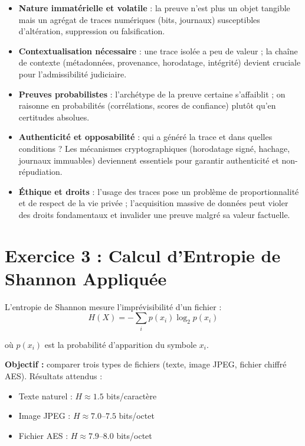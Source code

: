 \documentclass[memoire, 12pt]{report}
\begin{document}
\begin{titlepage}
\begin{itemize}
    \item \textbf{Nature immatérielle et volatile} : la preuve n’est plus un objet tangible mais un agrégat de traces numériques (bits, journaux) susceptibles d’altération, suppression ou falsification.
    \item \textbf{Contextualisation nécessaire} : une trace isolée a peu de valeur ; la chaîne de contexte (métadonnées, provenance, horodatage, intégrité) devient cruciale pour l’admissibilité judiciaire.
    \item \textbf{Preuves probabilistes} : l’archétype de la preuve certaine s’affaiblit ; on raisonne en probabilités (corrélations, scores de confiance) plutôt qu’en certitudes absolues.
    \item \textbf{Authenticité et opposabilité} : qui a généré la trace et dans quelles conditions ? Les mécanismes cryptographiques (horodatage signé, hachage, journaux immuables) deviennent essentiels pour garantir authenticité et non-répudiation.
    \item \textbf{Éthique et droits} : l’usage des traces pose un problème de proportionnalité et de respect de la vie privée ; l’acquisition massive de données peut violer des droits fondamentaux et invalider une preuve malgré sa valeur factuelle.
\end{itemize}

\newpage

\section*{Exercice 3 : Calcul d’Entropie de Shannon Appliquée}




L’entropie de Shannon mesure l’imprévisibilité d’un fichier :
\[
H(X) = - \sum_{i} p(x_i)\log_2 p(x_i)
\]

où $p(x_i)$ est la probabilité d’apparition du symbole $x_i$.

\textbf{Objectif :} comparer trois types de fichiers (texte, image JPEG, fichier chiffré AES).  
Résultats attendus :
\begin{itemize}
    \item Texte naturel : $H \approx 1.5$ bits/caractère
    \item Image JPEG : $H \approx 7.0$--$7.5$ bits/octet
    \item Fichier AES : $H \approx 7.9$--$8.0$ bits/octet
\end{itemize}


\end{titlepage}
\end{document}
